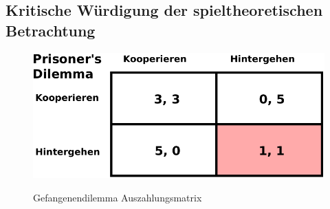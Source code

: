 \subsection{Kritische Würdigung der spieltheoretischen Betrachtung}


\begin{figure}%
\centering
\caption{Gefangenendilemma Auszahlungsmatrix}
\includegraphics[scale=0.8]{Grafiken/Prisoner_Ink.pdf} 
\label{pic:Prisoner}
\end{figure}
